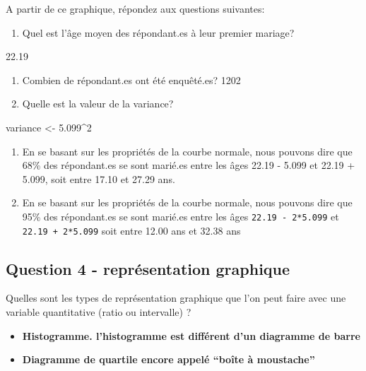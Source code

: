 \documentclass[
]{article}
\newenvironment{Shaded}{\begin{snugshade}}{\end{snugshade}}
\newcommand{\DecValTok}[1]{\textcolor[rgb]{0.00,0.00,0.81}{#1}}
\newcommand{\FloatTok}[1]{\textcolor[rgb]{0.00,0.00,0.81}{#1}}
\newcommand{\NormalTok}[1]{#1}
\newcommand{\OtherTok}[1]{\textcolor[rgb]{0.56,0.35,0.01}{#1}}
\newcommand{\SpecialCharTok}[1]{\textcolor[rgb]{0.00,0.00,0.00}{#1}}
\providecommand{\tightlist}{%
  \setlength{\itemsep}{0pt}\setlength{\parskip}{0pt}}
\begin{document}
A partir de ce graphique, répondez aux questions suivantes:

\begin{enumerate}
\def\labelenumi{\arabic{enumi}.}
\tightlist
\item
  Quel est l'âge moyen des répondant.es à leur premier mariage?
\end{enumerate}

22.19

\begin{enumerate}
\def\labelenumi{\arabic{enumi}.}
\setcounter{enumi}{1}
\item
  Combien de répondant.es ont été enquêté.es? 1202
\item
  Quelle est la valeur de la variance?
\end{enumerate}

\begin{Shaded}
\begin{Highlighting}[]
\NormalTok{variance }\OtherTok{\textless{}{-}} \FloatTok{5.099}\SpecialCharTok{\^{}}\DecValTok{2}
\end{Highlighting}
\end{Shaded}

\begin{enumerate}
\def\labelenumi{\arabic{enumi}.}
\setcounter{enumi}{3}
\item
  En se basant sur les propriétés de la courbe normale, nous pouvons
  dire que 68\% des répondant.es se sont marié.es entre les âges 22.19 -
  5.099 et 22.19 + 5.099, soit entre 17.10 et 27.29 ans.
\item
  En se basant sur les propriétés de la courbe normale, nous pouvons
  dire que 95\% des répondant.es se sont marié.es entre les âges
  \texttt{22.19\ -\ 2*5.099} et \texttt{22.19\ +\ 2*5.099} soit entre
  12.00 ans et 32.38 ans
\end{enumerate}

\hypertarget{question-4---repruxe9sentation-graphique}{%
\subsection{Question 4 - représentation
graphique}\label{question-4---repruxe9sentation-graphique}}

Quelles sont les types de représentation graphique que l'on peut faire
avec une variable quantitative (ratio ou intervalle) ?

\begin{itemize}
\tightlist
\item
  \textbf{Histogramme. l'histogramme est différent d'un diagramme de
  barre}
\item
  \textbf{Diagramme de quartile encore appelé ``boîte à moustache''}
\end{itemize}
\end{document}

